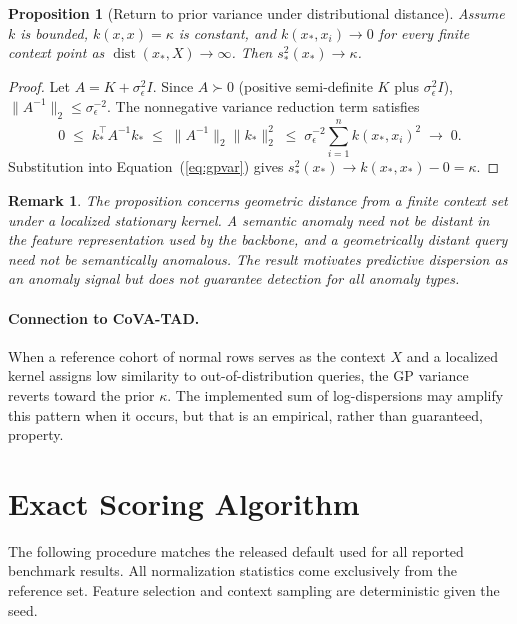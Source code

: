 \documentclass{article}
\newtheorem{proposition}{Proposition}
\newtheorem{remark}{Remark}
\begin{document}
\begin{proposition}[Return to prior variance under distributional distance]
\label{prop:prior-var}
Assume $k$ is bounded, $k(x,x)=\kappa$ is constant, and $k(x_*, x_i) \to 0$ for every finite context point as $\operatorname{dist}(x_*, X) \to \infty$. Then $s_*^2(x_*) \to \kappa$.
\end{proposition}

\begin{proof}
Let $A = K + \sigma_\epsilon^2 I$. Since $A \succ 0$ (positive semi-definite $K$ plus $\sigma_\epsilon^2 I$), $\|A^{-1}\|_2 \leq \sigma_\epsilon^{-2}$. The nonnegative variance reduction term satisfies
\[
  0 \;\leq\; k_*^\top A^{-1} k_* \;\leq\; \|A^{-1}\|_2 \|k_*\|_2^2 \;\leq\; \sigma_\epsilon^{-2} \sum_{i=1}^n k(x_*, x_i)^2 \;\to\; 0.
\]
Substitution into Equation~(\ref{eq:gpvar}) gives $s_*^2(x_*) \to k(x_*, x_*) - 0 = \kappa$.
\end{proof}

\begin{remark}
The proposition concerns geometric distance from a finite context set under a localized stationary kernel. A semantic anomaly need not be distant in the feature representation used by the backbone, and a geometrically distant query need not be semantically anomalous. The result motivates predictive dispersion as an anomaly signal but does not guarantee detection for all anomaly types.
\end{remark}

\paragraph{Connection to CoVA-TAD.}
When a reference cohort of normal rows serves as the context $X$ and a localized kernel assigns low similarity to out-of-distribution queries, the GP variance reverts toward the prior $\kappa$. The implemented sum of log-dispersions may amplify this pattern when it occurs, but that is an empirical, rather than guaranteed, property.

\section{Exact Scoring Algorithm}
\label{app:algorithm}

The following procedure matches the released default used for all reported benchmark results. All normalization statistics come exclusively from the reference set. Feature selection and context sampling are deterministic given the seed.
\end{document}
